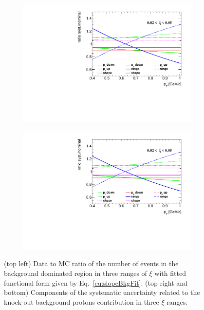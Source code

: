 \begin{figure}[t!]
\begin{subfigure}{.49\textwidth}
 		\includegraphics[width=\textwidth,page=2]{chapters/chrgSTAR/img/DCAproton/p_bkg.pdf}
 	\end{subfigure}
 	\begin{subfigure}{.49\textwidth}
 		\includegraphics[width=\textwidth,page=3]{chapters/chrgSTAR/img/DCAproton/p_bkg.pdf}
 	\end{subfigure}
 	\caption{(top left) Data to MC ratio of  the  number of events in the background dominated region in three ranges of $\xi$ with fitted functional form given by Eq.~\eqref{eq:slopeBkgFit}. (top right and bottom) Components of the systematic uncertainty related to the  knock-out background protons contribution in three $\xi$ ranges. }
 	\label{fig:protonBkgSyst}
 	
 \end{figure}

